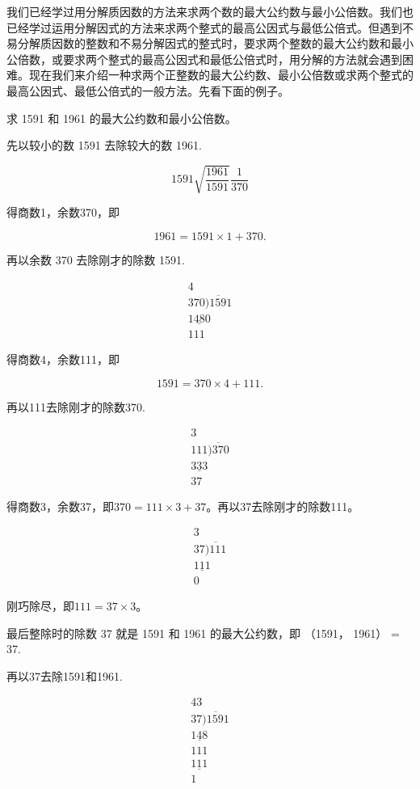 我们已经学过用分解质因数的方法来求两个数的最大公约数与最小公倍数。我们也已经学过运用分解因式的方法来求两个整式的最高公因式与最低公倍式。但遇到不易分解质因数的整数和不易分解因式的整式时，要求两个整数的最大公约数和最小公倍数，或要求两个整式的最高公因式和最低公倍式时，用分解的方法就会遇到困难。现在我们来介绍一种求两个正整数的最大公约数、最小公倍数或求两个整式的最高公因式、最低公倍式的一般方法。先看下面的例子。

 求 1591 和 1961 的最大公约数和最小公倍数。

 先以较小的数 1591 去除较大的数 1961.

\[
1591 \sqrt {\frac{1961}{1591}} \frac{1}{370}
\]

得商数1，余数370，即

\[
1961 = 1591 \times 1 + 370.
\]

再以余数 370 去除刚才的除数 1591.

\[
\begin{array}{r} 4 \\ 370 \overline {{) 1591}} \\ \underline {{1480}} \\ 111 \end{array}
\]

得商数4，余数111，即

\[
1591 = 370 \times 4 + 111.
\]

再以111去除刚才的除数370.

\[
\begin{array}{r} 3 \\ 111 \overline {{) 370}} \\ \underline {{333}} \\ 37 \end{array}
\]

得商数3，余数37，即\(370 = 111 \times 3 + 37\)。再以37去除刚才的除数111。

\[
\begin{array}{r} 3 \\ 37 \overline {{) 111}} \\ \underline {{111}} \\ 0 \end{array}
\]

刚巧除尽，即\(111 = 37 \times 3\)。

最后整除时的除数 37 就是 1591 和 1961 的最大公约数，即 （1591， 1961） =
37.

再以37去除1591和1961.

\[
\begin{array}{r} 43 \\ 37 \overline {{) 1591}} \\ \underline {{148}} \\ 111 \\ \underline {{111}} \\ 1 \end{array}
\]

